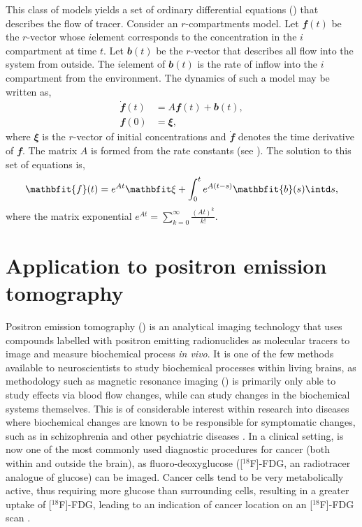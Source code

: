 This class of models yields a set of ordinary differential equations (\ode) that describes the flow of tracer. Consider an $r$-compartments model. Let $\mathbfit{f}(t)$ be the $r$-vector whose $i$\xth element corresponds to the concentration in the $i$\xth compartment at time $t$. Let $\mathbfit{b}(t)$ be the $r$-vector that describes all flow into the system from outside. The $i$\xth element of $\mathbfit{b}(t)$ is the rate of inflow into the $i$\xth compartment from the environment. The dynamics of such a model may be written as,
\begin{align*}
  \dot{\mathbfit{f}}(t) &= A\mathbfit{f}(t) + \mathbfit{b}(t), \\
  \mathbfit{f}(0) &= \mathbfit\xi,
\end{align*}
where $\mathbfit\xi$ is the $r$-vector of initial concentrations and $\dot{\mathbfit{f}}$ denotes the time derivative of $\mathbfit{f}$. The matrix $A$ is formed from the rate constants (see \cite{Gunn:2001cx}). The solution \cite[][sec.~8.3.1]{Seber:2003vx} to this set of equations is,
\begin{equation*}
  \mathbfit{f}(t) = e^{A t}\mathbfit\xi +
  \int_0^t e^{A(t-s)}\mathbfit{b}(s)\intd s,
\end{equation*}
where the matrix exponential $e^{A t} = \sum_{k=0}^{\infty} \frac{(At)^k}{k!}$.

\section{Application to positron emission tomography}
\label{sec:Application to positron emission tomography}

Positron emission tomography (\pet) is an analytical imaging technology that uses compounds labelled with positron emitting radionuclides as molecular tracers to image and measure biochemical process \emph{in vivo}. It is one of the few methods available to neuroscientists to study biochemical processes within living brains, as methodology such as magnetic resonance imaging (\mri) is primarily only able to study effects via blood flow changes, while \pet can study changes in the biochemical systems themselves. This is of considerable interest within research into diseases where biochemical changes are known to be responsible for symptomatic changes, such as in schizophrenia and other psychiatric diseases \cite{FrankleL2002}. In a clinical setting, \pet is now one of the most commonly used diagnostic procedures for cancer (both within and outside the brain), as fluoro-deoxyglucose ([$^{18}$F]-FDG, an radiotracer analogue of glucose) can be imaged. Cancer cells tend to be very metabolically active, thus requiring more glucose than surrounding cells, resulting in a greater uptake of [$^{18}$F]-FDG, leading to an indication of cancer location on an [$^{18}$F]-FDG scan \cite{Gambhir2002}.

